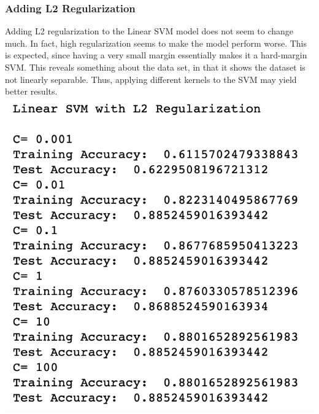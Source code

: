 \documentclass[11pt, oneside]{article}
\begin{document}
\subsubsection *{Adding L2 Regularization}
Adding L2 regularization to the Linear SVM model does not seem to change much. In fact, high regularization seems to make the model perform worse. This is expected, since having a very small margin essentially makes it a hard-margin SVM. This reveals something about the data set, in that it shows the dataset is not linearly separable. Thus, applying different kernels to the SVM may yield better results.\\
\includegraphics{4}\\
\end{document}
